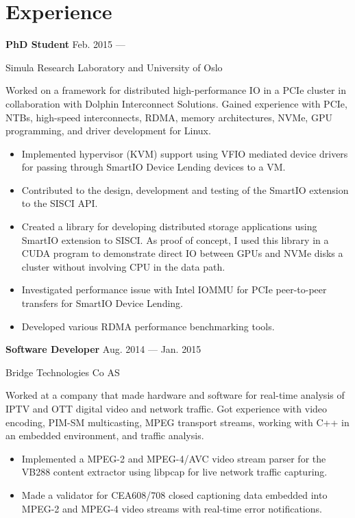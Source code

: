 \section{Experience}
\parbox[t][][t]{\linewidth}{
	\parbox{\linewidth}{\textbf{PhD Student}
		\hfill {{Feb. 2015 --- \phantom{Sep. 2018}}}}
		\smallbreak
	\parbox{\linewidth}{Simula Research Laboratory and University of Oslo}

	\bigskip
	Worked on a framework for distributed high-performance IO in a PCIe cluster in
	collaboration with Dolphin Interconnect Solutions. Gained
	experience with PCIe, NTBs, high-speed interconnects, RDMA, memory
	architectures, NVMe, GPU programming, and driver development for Linux.

	\bigskip
	\begin{itemize}
		\item{Implemented hypervisor (KVM) support using VFIO mediated device drivers
			for passing through SmartIO Device Lending devices to a VM.}\\[-.6em]
		\item{Contributed to the design, development and testing of the SmartIO
			extension to the SISCI API.}\\[-.6em]
		\item{Created a library for developing distributed storage
			applications using SmartIO extension to SISCI.
			As proof of concept, I used this library in a CUDA program to demonstrate direct
			IO between GPUs and NVMe disks a cluster without
			involving CPU in the data path.}\\[-.6em]
		\item{Investigated performance issue with Intel IOMMU for PCIe
			peer-to-peer transfers for SmartIO Device Lending.}\\[-.6em]
		\item{Developed various RDMA performance benchmarking tools.}
	\end{itemize}
	\bigskip
	\bigskip
}

\parbox[t][][t]{\linewidth}{
	\parbox{\linewidth}{\textbf{Software Developer}
		\hfill {{Aug. 2014 --- Jan. 2015}}}
		\smallbreak
	\parbox{\linewidth}{Bridge Technologies Co AS}

	\bigskip
	Worked at a company that made hardware and software
	for real-time analysis of IPTV and OTT digital video and network
	traffic. Got experience with video encoding, PIM-SM multicasting, MPEG transport
	streams, working with C++ in an embedded environment, and
	traffic analysis.

	\bigskip
	\begin{itemize}
		\item{Implemented a MPEG-2 and MPEG-4/AVC video stream parser for the
			VB288 content extractor using libpcap for live network
			traffic capturing.}\\[-.6em]
		\item{Made a validator for CEA608/708 closed captioning data
		embedded into MPEG-2 and MPEG-4 video streams with real-time
			error notifications.}
	\end{itemize}
	\bigskip
	\bigskip
}

